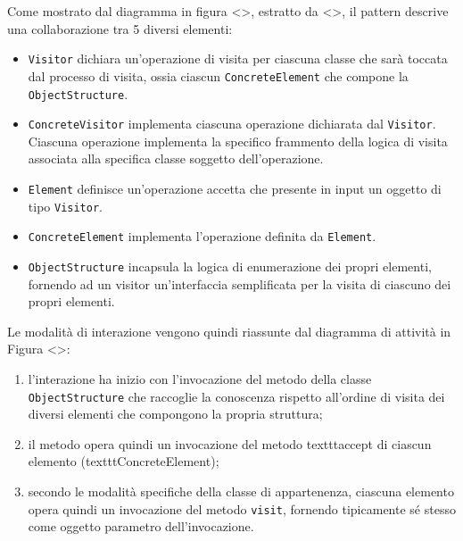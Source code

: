 Come mostrato dal diagramma in figura <>, estratto da <>, il pattern descrive
una collaborazione tra 5 diversi elementi:

\begin{itemize}

\item \texttt{Visitor} dichiara un'operazione di visita per ciascuna classe
che sarà toccata dal processo di visita, ossia ciascun
\texttt{ConcreteElement} che compone la \texttt{ObjectStructure}.

\item \texttt{ConcreteVisitor} implementa ciascuna operazione dichiarata dal
\texttt{Visitor}. Ciascuna operazione implementa la specifico frammento della
logica di visita associata alla specifica classe soggetto dell'operazione.

\item \texttt{Element} definisce un'operazione accetta che presente in input un
oggetto di tipo \texttt{Visitor}.

\item \texttt{ConcreteElement} implementa l'operazione definita da
\texttt{Element}.

\item \texttt{ObjectStructure} incapsula la logica di enumerazione dei propri
elementi, fornendo ad un visitor un'interfaccia semplificata per la visita di
ciascuno dei propri elementi.

\end{itemize}

Le modalità di interazione vengono quindi riassunte dal diagramma di attività
in Figura <>:

\begin{enumerate}

\item l'interazione ha inizio con l'invocazione del metodo della classe
\texttt{ObjectStructure} che raccoglie la conoscenza rispetto all'ordine di
visita dei diversi elementi che compongono la propria struttura;

\item il metodo opera quindi un invocazione del metodo texttt{accept} di
ciascun elemento (texttt{ConcreteElement});

\item secondo le modalità specifiche della classe di appartenenza, ciascuna
elemento opera quindi un invocazione del metodo \texttt{visit}, fornendo
tipicamente sé stesso come oggetto parametro dell'invocazione.

\end{enumerate}

